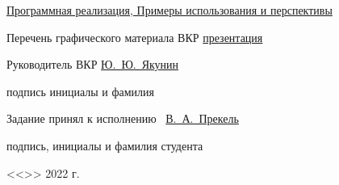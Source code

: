 \begin{spacing}{1}
{        \uline{Программная реализация, Примеры использования и перспективы \hfill}

        \uline{\hfill}

        \uline{\hfill}

        Перечень графического материала ВКР \uline{презентация\hfill}

        \uline{\hfill}

        \uline{\hfill}

        \uline{\hfill}

        \vfill

        Руководитель ВКР
        \hfill
        \uline{\hspace{10.5ex}}
        \hspace{6ex}
        \uline{Ю.~Ю.~Якунин}

        \vspace{-4pt}

        \hfill
        {\footnotesize подпись}
        \hspace{8.5ex}
        {\footnotesize инициалы и фамилия}

        Задание принял к исполнению~
        \hfill
        \uline{\hspace{18.5ex}В.~А.~Прекель}

        \vspace{-4pt}

        \hfill
        {\footnotesize подпись, инициалы и фамилия студента}

        \vspace{1em}

        \hfill <<\uline{\hspace{3ex}}>> \uline{\hspace{9ex}} 2022 г.
    }
\end{spacing}

\thispagestyle{empty}

\clearpage
